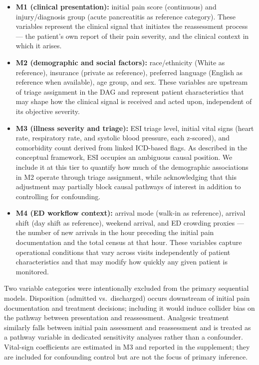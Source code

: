 \begin{itemize}
  \item \textbf{M1 (clinical presentation):} initial pain score (continuous) and injury/diagnosis group (acute pancreatitis as reference category). These variables represent the clinical signal that initiates the reassessment process --- the patient's own report of their pain severity, and the clinical context in which it arises.

  \item \textbf{M2 (demographic and social factors):} race/ethnicity (White as reference), insurance (private as reference), preferred language (English as reference when available), age group, and sex. These variables are upstream of triage assignment in the DAG and represent patient characteristics that may shape how the clinical signal is received and acted upon, independent of its objective severity.

  \item \textbf{M3 (illness severity and triage):} ESI triage level, initial vital signs (heart rate, respiratory rate, and systolic blood pressure, each z-scored), and comorbidity count derived from linked ICD-based flags. As described in the conceptual framework, ESI occupies an ambiguous causal position. We include it at this tier to quantify how much of the demographic associations in M2 operate through triage assignment, while acknowledging that this adjustment may partially block causal pathways of interest in addition to controlling for confounding.

  \item \textbf{M4 (ED workflow context):} arrival mode (walk-in as reference), arrival shift (day shift as reference), weekend arrival, and ED crowding proxies --- the number of new arrivals in the hour preceding the initial pain documentation and the total census at that hour. These variables capture operational conditions that vary across visits independently of patient characteristics and that may modify how quickly any given patient is monitored.
\end{itemize}

Two variable categories were intentionally excluded from the primary sequential models.
Disposition (admitted vs.\ discharged) occurs downstream of initial pain documentation and treatment decisions; including it would induce collider bias on the pathway between presentation and reassessment.
Analgesic treatment similarly falls between initial pain assessment and reassessment and is treated as a pathway variable in dedicated sensitivity analyses rather than a confounder.
Vital-sign coefficients are estimated in M3 and reported in the supplement; they are included for confounding control but are not the focus of primary inference.

